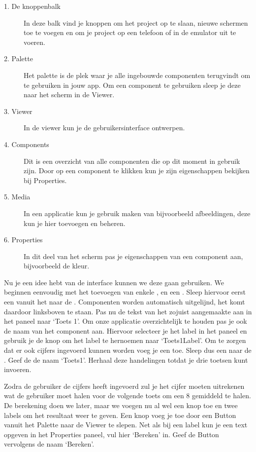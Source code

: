 \begin{description}
  \item[1. De knoppenbalk] In deze balk vind je knoppen om het project op te slaan, nieuwe schermen toe te voegen en om je project op een telefoon of in de emulator uit te voeren.
  \item[2. Palette] Het palette is de plek waar je alle ingebouwde componenten terugvindt om te gebruiken in jouw app. Om een component te gebruiken sleep je deze naar het scherm in de Viewer.
  \item[3. Viewer] In de viewer kun je de gebruikersinterface ontwerpen. 
  \item[4. Components] Dit is een overzicht van alle componenten die op dit moment in gebruik zijn. Door op een component te klikken kun je zijn eigenschappen bekijken bij Properties.
  \item[5. Media] In een applicatie kun je gebruik maken van bijvoorbeeld afbeeldingen, deze kun je hier toevoegen en beheren.
  \item[6. Properties] In dit deel van het scherm pas je eigenschappen van een component aan, bijvoorbeeld de kleur.
\end{description}

Nu je een idee hebt van de interface kunnen we deze gaan gebruiken. We beginnen eenvoudig met het toevoegen van enkele ,  en een . Sleep hiervoor eerst een  vanuit het  naar de . Componenten worden automatisch uitgelijnd, het  komt daardoor linksboven te staan. Pas nu de tekst van het zojuist aangemaakte  aan in het  paneel naar `Toets 1'. Om onze applicatie overzichtelijk te houden pas je ook de naam van het component aan. Hiervoor selecteer je het label in het  paneel en gebruik je de knop  om het label te hernoemen naar `Toets1Label'.
Om te zorgen dat er ook cijfers ingevoerd kunnen worden voeg je een  toe. 
Sleep dus een  naar de . 
Geef de  de naam `Toets1'. Herhaal deze handelingen totdat je drie toetsen kunt invoeren.

Zodra de gebruiker de cijfers heeft ingevoerd zul je het cijfer moeten uitrekenen wat de gebruiker moet halen voor de volgende toets om een 8 gemiddeld te halen. De berekening doen we later, maar we voegen nu al wel een knop toe en twee labels om het resultaat weer te geven. Een knop voeg je toe door een Button vanuit het Palette naar de Viewer te slepen. Net als bij een label kun je een text opgeven in het Properties paneel, vul hier `Bereken' in. Geef de Button vervolgens de naam `Bereken'.

